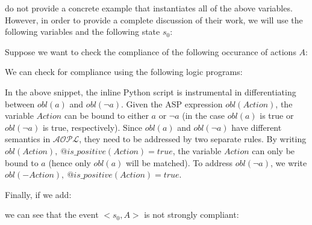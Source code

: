 \citet{gelfond_authorization_2008} do not provide a concrete example that instantiates all of the above variables.
However, in order to provide a complete discussion of their work, we will use the following variables and the following state $s_0$:



Suppose we want to check the compliance of the following occurance of actions $A$:


We can check for compliance using the following logic programs\footnotemark:





In the above snippet, the inline Python script is instrumental in differentiating between $obl(a)$ and $obl(\neg a)$.
Given the ASP expression $obl(Action)$, the variable $Action$ can be bound to either $a$ or $\neg a$ (in the case $obl(a)$ is true or $obl(\neg a)$ is true, respectively).
Since $obl(a)$ and $obl(\neg a)$ have different semantics in $\mathcal{AOPL}$, they need to be addressed by two separate rules.
By writing $obl(Action), \ @is\_positive(Action) = true$, the variable $Action$ can only be bound to $a$ (hence only $obl(a)$ will be matched).
To address $obl(\neg a)$, we write $obl(-Action), \ @is\_positive(Action) = true$.

Finally, if we add:

we can see that the event $<s_0, A>$ is not strongly compliant:


